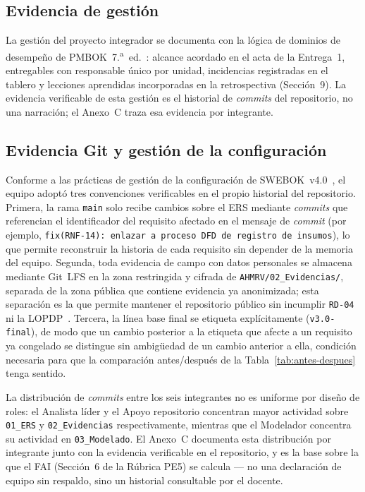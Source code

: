 \documentclass[11pt,a4paper]{article}
\newcommand{\id}[1]{\texttt{#1}}
\begin{document}
\subsection{Evidencia de gestión}

La gestión del proyecto integrador se documenta con la lógica de dominios de desempeño de
PMBOK~7.\textsuperscript{a}~ed.~\cite{pmbok7}: alcance acordado en el acta de la Entrega~1,
entregables con responsable único por unidad, incidencias registradas en el tablero y lecciones
aprendidas incorporadas en la retrospectiva (Sección~9). La evidencia verificable de esta gestión
es el historial de \emph{commits} del repositorio, no una narración; el Anexo~C traza esa evidencia
por integrante.

\subsection{Evidencia Git y gestión de la configuración}

Conforme a las prácticas de gestión de la configuración de SWEBOK~v4.0~\cite{swebok4}, el equipo
adoptó tres convenciones verificables en el propio historial del repositorio. Primera, la rama
\texttt{main} solo recibe cambios sobre el ERS mediante \emph{commits} que referencian el
identificador del requisito afectado en el mensaje de \emph{commit} (por ejemplo,
\texttt{fix(RNF-14): enlazar a proceso DFD de registro de insumos}), lo que permite reconstruir la
historia de cada requisito sin depender de la memoria del equipo. Segunda, toda evidencia de campo
con datos personales se almacena mediante Git~LFS en la zona restringida y cifrada de
\id{AHMRV/02\_Evidencias/}, separada de la zona pública que contiene evidencia ya anonimizada; esta
separación es la que permite mantener el repositorio público sin incumplir \id{RD-04} ni la
LOPDP~\cite{lopdp2021}. Tercera, la línea base final se etiqueta explícitamente
(\texttt{v3.0-final}), de modo que un cambio posterior a la etiqueta que afecte a un requisito ya
congelado se distingue sin ambigüedad de un cambio anterior a ella, condición necesaria para que la
comparación antes/después de la Tabla~\ref{tab:antes-despues} tenga sentido.

La distribución de \emph{commits} entre los seis integrantes no es uniforme por diseño de roles: el
Analista líder y el Apoyo repositorio concentran mayor actividad sobre \id{01\_ERS} y
\id{02\_Evidencias} respectivamente, mientras que el Modelador concentra su actividad en
\id{03\_Modelado}. El Anexo~C documenta esta distribución por integrante junto con la evidencia
verificable en el repositorio, y es la base sobre la que el FAI (Sección~6 de la Rúbrica PE5) se
calcula --- no una declaración de equipo sin respaldo, sino un historial consultable por el
docente.
\end{document}
